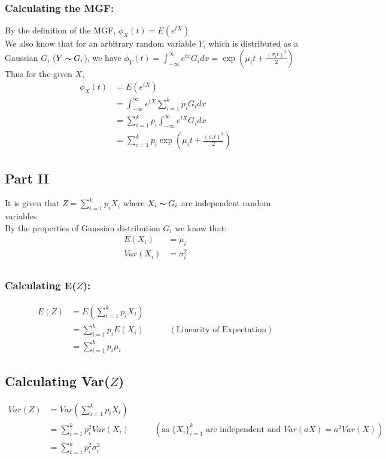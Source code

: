 \documentclass[11pt, fleqn]{article}
\begin{document}
\subsubsection*{Calculating the MGF:}
By the definition of the MGF, $\phi_X (t) = E(e^{tX})$\\
We also know that for an arbitrary random variable $Y$, which is distributed as a Gaussian $G_i$ ($Y \thicksim G_i$), we have $\phi_Y (t) = \int_{-\infty}^{\infty}e^{tx} G_i dx = \exp(\mu_i t + \frac{(\sigma_i t)^2}{2})$\\
Thus for the given $X$,
$$
\begin{aligned}
    \phi_X (t) &= E(e^{tX}) \\
    &= \int_{-\infty}^{\infty}e^{tX} \sum_{i=1}^{k}p_i G_i dx\\
    &= \sum_{i=1}^{k}p_i \int_{-\infty}^{\infty}e^{tX} G_i dx\\
    &= \boxed{\sum_{i=1}^{k}p_i\exp(\mu_i t + \frac{(\sigma_i t)^2}{2})}
\end{aligned}
$$
\subsection*{Part II}
It is given that $Z = \sum_{i=1}^{k}p_i X_i $ where $X_i \thicksim G_i$ are independent random variables.\\
By the properties of Gaussian distribution $G_i$ we know that:\\
$$
\begin{aligned}
E(X_i) &= \mu_i\\
Var(X_i) &= \sigma_i^2\\
\end{aligned}
$$
\subsubsection*{Calculating E($Z$):}
$$
\begin{aligned}
    E(Z) &= E( \sum_{i=1}^{k}p_i X_i)\\
    &= \sum_{i=1}^{k}p_i E(X_i) \hspace{3em} (\text{Linearity of Expectation})\\
    &= \boxed{ \sum_{i=1}^{k}p_i\mu_i }
\end{aligned}
$$
\subsection*{Calculating Var($Z$)}
$$
\begin{aligned}
    Var(Z) &= Var( \sum_{i=1}^{k}p_i X_i)\\
    &= \sum_{i=1}^{k}p_i^2 Var(X_i) \hspace{3em} (\text{as $\{ X_i\}_{i=1}^k$ are independent and $Var(aX) = a^2Var(X)$})\\
    &= \boxed{ \sum_{i=1}^{k}p_i^2\sigma_i^2 }
\end{aligned}
$$
\end{document}
